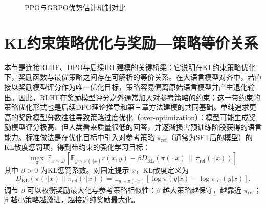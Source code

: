 \begin{figure}[htbp]
{}
    \caption{PPO与GRPO优势估计机制对比}
    \label{fig:ppo_grpo_advantage}
\end{figure}

\section{KL约束策略优化与奖励—策略等价关系}

本节是连接RLHF、DPO与后续IRL建模的关键桥梁：它说明在KL约束策略优化下，奖励函数与最优策略之间存在可解析的等价关系。在大语言模型对齐中，若直接以奖励模型评分作为唯一优化目标，策略容易偏离原始语言模型并产生退化输出。因此，RLHF在奖励模型评分之外通常加入对参考策略的约束；这一带约束的策略优化形式也是后续DPO理论推导和第三章方法建模的共同基础。单纯追求更高的奖励模型分数往往导致策略过度优化（over-optimization）：模型可能生成奖励模型评分极高、但人类看来质量很低的回答，并逐渐损害预训练阶段获得的语言能力。标准做法是在优化目标中引入对参考策略 $\pi_{\text{ref}}$（通常为SFT后的模型）的KL散度惩罚项，得到带约束的强化学习目标\cite{ouyang2022training}：
\begin{equation}
    \max_{\pi}\,
    \mathbb{E}_{x \sim \mathcal{D}}
    \left[
    \mathbb{E}_{y \sim \pi(\cdot|x)} r(x, y)
    -
    \beta D_{\mathrm{KL}}\left(
    \pi(\cdot|x) \,\|\, \pi_{\mathrm{ref}}(\cdot|x)
    \right)
    \right]
    \label{eq:kl_constrained}
\end{equation}
其中 $\beta > 0$ 为KL惩罚系数。对固定提示 $x$，KL散度定义为
\begin{equation}
    D_{\mathrm{KL}}\left(\pi(\cdot|x) \| \pi_{\mathrm{ref}}(\cdot|x)\right)
    =
    \mathbb{E}_{y \sim \pi(\cdot|x)}
    \left[
    \log \pi(y|x) - \log \pi_{\mathrm{ref}}(y|x)
    \right].
\end{equation}
调节 $\beta$ 可以权衡奖励最大化与参考策略相似性：$\beta$ 越大策略越保守，越靠近 $\pi_{\mathrm{ref}}$；$\beta$ 越小策略越激进，越接近纯奖励最大化。

